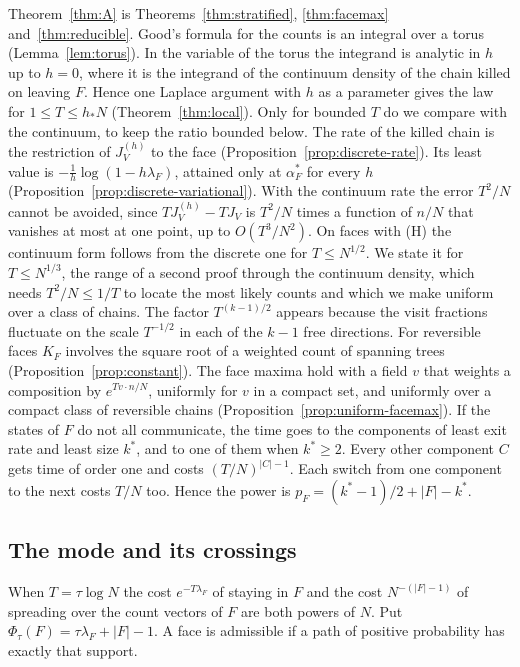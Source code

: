 Theorem~\ref{thm:A} is Theorems~\ref{thm:stratified}, \ref{thm:facemax}
and~\ref{thm:reducible}.
Good's formula for the counts is an integral over a torus (Lemma~\ref{lem:torus}).
In the variable of the torus the integrand is analytic in $h$ up to $h=0$, where it
is the integrand of the continuum density of the chain killed on leaving $F$. Hence
one Laplace argument with $h$ as a parameter gives the law for $1\le T\le h_*N$
(Theorem~\ref{thm:local}). Only for bounded $T$ do we compare with the continuum,
to keep the ratio bounded below. The rate of the killed chain is the restriction of
$J^{(h)}_V$ to the face (Proposition~\ref{prop:discrete-rate}). Its least value is
$-\frac1h\log(1-h\lambda_F)$, attained only at $\alpha^*_F$ for every $h$
(Proposition~\ref{prop:discrete-variational}). With the continuum rate the error
$T^2/N$ cannot be avoided, since $TJ^{(h)}_V-TJ_V$ is $T^2/N$ times a function
of $n/N$ that vanishes at most at one point, up to $O(T^3/N^2)$. On faces with (H)
the continuum form follows from the discrete one for $T\le N^{1/2}$. We state it for
$T\le N^{1/3}$, the range of a second proof through the continuum density, which needs
$T^2/N\le1/T$ to locate the most likely counts and which we make uniform over a class of
chains. The factor $T^{(k-1)/2}$ appears because
the visit fractions fluctuate on the scale $T^{-1/2}$ in each of the $k-1$ free
directions. For reversible faces $K_F$ involves the square root of a weighted
count of spanning trees (Proposition~\ref{prop:constant}). The face maxima hold
with a field $v$ that weights a composition by $e^{Tv\cdot n/N}$, uniformly for
$v$ in a compact set, and uniformly over a compact class of reversible chains
(Proposition~\ref{prop:uniform-facemax}). If the states of $F$ do not all
communicate, the time goes to the components of least exit rate and least size $k^*$,
and to one of them when $k^*\ge2$. Every other component $C$ gets time of order one
and costs $(T/N)^{|C|-1}$. Each switch
from one component to the next costs $T/N$ too. Hence the power is $p_F=(k^*-1)/2+|F|-k^*$.

\subsection{The mode and its crossings}\label{sec:intro-faces}

When $T=\tau\log N$ the cost $e^{-T\lambda_F}$ of staying in $F$ and the cost
$N^{-(|F|-1)}$ of spreading over the count vectors of $F$ are both powers of $N$.
Put $\Phi_\tau(F)=\tau\lambda_F+|F|-1$. A face is admissible if a path of
positive probability has exactly that support.

